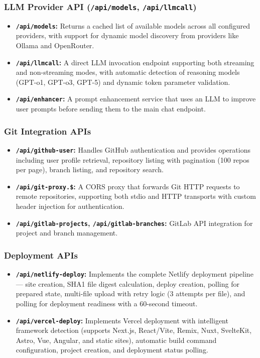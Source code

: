 \documentclass[12pt,a4paper,openany]{report}
\begin{document}
\subsubsection{LLM Provider API (\texttt{/api/models}, \texttt{/api/llmcall})}
\begin{itemize}
    \item \textbf{\texttt{/api/models}:} Returns a cached list of available models across all configured providers, with support for dynamic model discovery from providers like Ollama and OpenRouter.
    \item \textbf{\texttt{/api/llmcall}:} A direct LLM invocation endpoint supporting both streaming and non-streaming modes, with automatic detection of reasoning models (GPT-o1, GPT-o3, GPT-5) and dynamic token parameter validation.
    \item \textbf{\texttt{/api/enhancer}:} A prompt enhancement service that uses an LLM to improve user prompts before sending them to the main chat endpoint.
\end{itemize}

\subsubsection{Git Integration APIs}
\begin{itemize}
    \item \textbf{\texttt{/api/github-user}:} Handles GitHub authentication and provides operations including user profile retrieval, repository listing with pagination (100 repos per page), branch listing, and repository search.
    \item \textbf{\texttt{/api/git-proxy.\$}:} A CORS proxy that forwards Git HTTP requests to remote repositories, supporting both stdio and HTTP transports with custom header injection for authentication.
    \item \textbf{\texttt{/api/gitlab-projects}, \texttt{/api/gitlab-branches}:} GitLab API integration for project and branch management.
\end{itemize}

\subsubsection{Deployment APIs}
\begin{itemize}
    \item \textbf{\texttt{/api/netlify-deploy}:} Implements the complete Netlify deployment pipeline --- site creation, SHA1 file digest calculation, deploy creation, polling for prepared state, multi-file upload with retry logic (3 attempts per file), and polling for deployment readiness with a 60-second timeout.
    \item \textbf{\texttt{/api/vercel-deploy}:} Implements Vercel deployment with intelligent framework detection (supports Next.js, React/Vite, Remix, Nuxt, SvelteKit, Astro, Vue, Angular, and static sites), automatic build command configuration, project creation, and deployment status polling.
\end{itemize}
\end{document}
